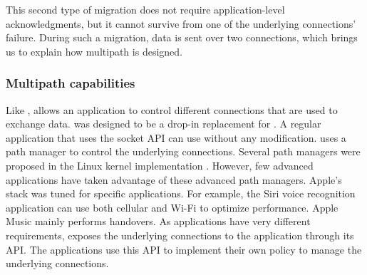 
This second type of migration does not require application-level
acknowledgments, but it cannot survive from one of the
underlying connections' failure. During such a migration, data is sent over two
connections, which brings us to explain how multipath is designed.

\subsubsection{Multipath capabilities}

Like \mptcp, \tcpls allows an application to control different \tcp connections 
that are used to exchange data. \mptcp was designed to be a drop-in replacement 
for \tcp. A regular application that uses the socket API can use \mptcp without 
any modification. \mptcp uses a path manager to control the underlying \tcp 
connections. Several path managers were proposed in the Linux kernel 
implementation \cite{TODO}. However, few advanced applications have taken 
advantage of these advanced path managers. Apple's \mptcp stack was tuned for 
specific applications. For example, the Siri voice recognition application can 
use both cellular and Wi-Fi to optimize performance. Apple Music mainly 
performs handovers. As applications have very different requirements, \tcpls 
exposes the underlying \tcp connections to the application through its API. The 
applications use this API to implement their own policy to manage the 
underlying \tcp connections.

